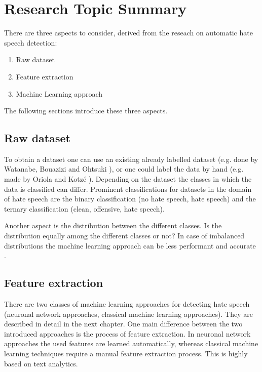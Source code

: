 \section{Research Topic Summary}

There are three aspects to consider, derived from the reseach on automatic hate speech detection:
\begin{enumerate}
	\item Raw dataset
	\item Feature extraction
	\item Machine Learning approach
\end{enumerate}

\noindent
The following sections introduce these three aspects.

\subsection{Raw dataset}
To obtain a dataset one can use an existing already labelled dataset (e.g. done by Watanabe, Bouazizi and Ohtsuki \cite{8292838}), or one could label the data by hand (e.g. made by Oriola and Kotz\'{e} \cite{8963960}).
Depending on the dataset the classes in which the data is classified can differ. Prominent classifications for datasets in the domain of hate speech are the binary classification (no hate speech, hate speech) and the ternary classification (clean, offensive, hate speech). 

Another aspect is the distribution between the different classes. Is the distribution equally among the different classes or not? In case of imbalanced distributions the machine learning approach can be less performant and accurate \cite{8963960}.


\subsection{Feature extraction}
There are two classes of machine learning approaches for detecting hate speech (neuronal network approaches, classical machine learning approaches). They are described in detail in the next chapter. One main difference between the two introduced approaches is the process of feature extraction. In neuronal network approaches the used features are learned automatically, whereas classical machine learning techniques require a manual feature ex\-trac\-tion process. This is highly based on text analytics.

